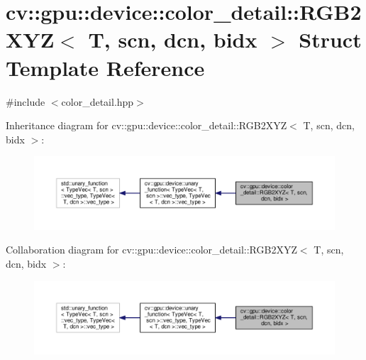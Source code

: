 \hypertarget{structcv_1_1gpu_1_1device_1_1color__detail_1_1RGB2XYZ}{\section{cv\-:\-:gpu\-:\-:device\-:\-:color\-\_\-detail\-:\-:R\-G\-B2\-X\-Y\-Z$<$ T, scn, dcn, bidx $>$ Struct Template Reference}
\label{structcv_1_1gpu_1_1device_1_1color__detail_1_1RGB2XYZ}
}


{\ttfamily \#include $<$color\-\_\-detail.\-hpp$>$}



Inheritance diagram for cv\-:\-:gpu\-:\-:device\-:\-:color\-\_\-detail\-:\-:R\-G\-B2\-X\-Y\-Z$<$ T, scn, dcn, bidx $>$\-:\nopagebreak
\begin{figure}[H]
\begin{center}
\leavevmode
\includegraphics[width=350pt]{structcv_1_1gpu_1_1device_1_1color__detail_1_1RGB2XYZ__inherit__graph}
\end{center}
\end{figure}


Collaboration diagram for cv\-:\-:gpu\-:\-:device\-:\-:color\-\_\-detail\-:\-:R\-G\-B2\-X\-Y\-Z$<$ T, scn, dcn, bidx $>$\-:\nopagebreak
\begin{figure}[H]
\begin{center}
\leavevmode
\includegraphics[width=350pt]{structcv_1_1gpu_1_1device_1_1color__detail_1_1RGB2XYZ__coll__graph}
\end{center}
\end{figure}

